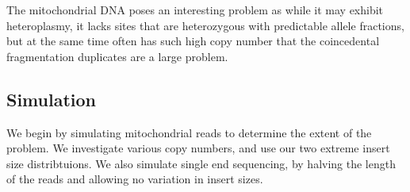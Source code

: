 \documentclass{article}
\begin{document}
The mitochondrial DNA poses an interesting problem as while it may exhibit heteroplasmy, it lacks sites that are heterozygous with predictable allele fractions, but at the same time often has such high copy number that the coincedental fragmentation duplicates are a large problem.

\subsection{Simulation}

We begin by simulating mitochondrial reads to determine the extent of the problem. We investigate various copy numbers, and use our two extreme insert size distribtuions. We also simulate single end sequencing, by halving the length of the reads and allowing no variation in insert sizes.
\end{document}
